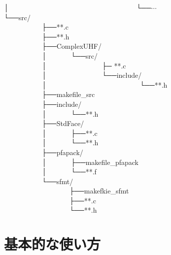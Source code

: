 │~~~~~~~~~~~~~~~~~~~~~~~~~~~~~~~~~~~~~└──$\cdots$\\
└──src/\\
~~~~~~~~~~~├──**.c\\
~~~~~~~~~~~├──**.h\\
~~~~~~~~~~~├──ComplexUHF/\\
~~~~~~~~~~~│~~~~~~~└──src/\\
~~~~~~~~~~~│~~~~~~~~~~~~~~~~├─ **.c\\
~~~~~~~~~~~│~~~~~~~~~~~~~~~~└──include/\\
~~~~~~~~~~~│~~~~~~~~~~~~~~~~~~~~~~~~~~~└──**.h\\
~~~~~~~~~~~├──makefile\_src\\
~~~~~~~~~~~├──include/\\
~~~~~~~~~~~│~~~~~~~└──**.h\\
~~~~~~~~~~~├──StdFace/\\
~~~~~~~~~~~│~~~~~~~├──**.c\\
~~~~~~~~~~~│~~~~~~~└──**.h\\
~~~~~~~~~~~├──pfapack/\\
~~~~~~~~~~~│~~~~~~~├──makefile\_pfapack\\
~~~~~~~~~~~│~~~~~~~└──**.f\\
~~~~~~~~~~~└──sfmt/\\
~~~~~~~~~~~~~~~~~~~├──makefkie\_sfmt\\
~~~~~~~~~~~~~~~~~~~├──**.c\\
~~~~~~~~~~~~~~~~~~~└──**.h\\

\newpage
\section{基本的な使い方}


